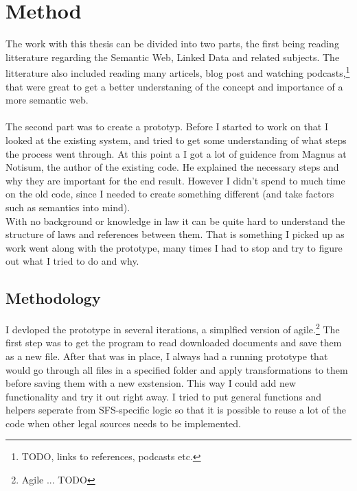 \chapter{Method}

The work with this thesis can be divided into two parts, the first being reading litterature regarding the Semantic Web, Linked Data and related subjects. The litterature also included reading many articels, blog post and watching podcasts,\footnote{TODO, links to references, podcasts etc.} that were great to get a better understaning of the concept and importance of a more semantic web.\\\\  
The second part was to create a prototyp. Before I started to work on that I looked at the existing system, and tried to get some understanding of what steps the process went through. At this point a I got a lot of guidence from Magnus at Notisum, the author of the existing code. He explained the necessary steps and why they are important for the end result. However I didn't spend to much time on the old code, since I needed to create something different (and take factors such as semantics into mind).\\ With no background or knowledge in law it can be quite hard to understand the structure of laws and references between them. That is something I picked up as work went along with the prototype, many times I had to stop and try to figure out what I tried to do and why. 

\section{Methodology}
I devloped the prototype in several iterations, a simplfied version of agile.\footnote{Agile ... TODO} The first step was to get the program to read downloaded documents and save them as a new file. After that was in place, I always had a running prototype that would go through all files in a specified folder and apply transformations to them before saving them with a new exstension. This way I could add new functionality and try it out right away. I tried to put general functions and helpers seperate from SFS-specific logic so that it is possible to reuse a lot of the code when other legal sources needs to be implemented.     


